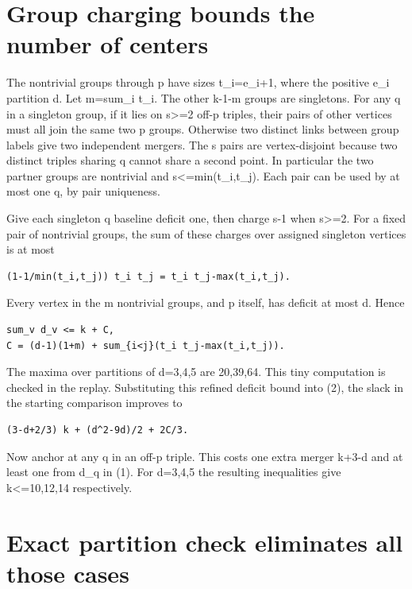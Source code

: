 \documentclass[11pt,letterpaper]{article}
\begin{document}
\section{Group charging bounds the number of
centers}\label{2-group-charging-bounds-the-number-of-centers}

The nontrivial groups through p have sizes t\_i=e\_i+1, where the
positive e\_i partition d. Let m=sum\_i t\_i. The other k-1-m groups are
singletons. For any q in a singleton group, if it lies on s>=2 off-p
triples, their pairs of other vertices must all join the same two p
groups. Otherwise two distinct links between group labels give two
independent mergers. The s pairs are vertex-disjoint because two
distinct triples sharing q cannot share a second point. In particular
the two partner groups are nontrivial and s<=min(t\_i,t\_j). Each pair
can be used by at most one q, by pair uniqueness.

Give each singleton q baseline deficit one, then charge s-1 when s>=2.
For a fixed pair of nontrivial groups, the sum of these charges over
assigned singleton vertices is at most

\begin{verbatim}
(1-1/min(t_i,t_j)) t_i t_j = t_i t_j-max(t_i,t_j).
\end{verbatim}

Every vertex in the m nontrivial groups, and p itself, has deficit at
most d. Hence

\begin{verbatim}
sum_v d_v <= k + C,
C = (d-1)(1+m) + sum_{i<j}(t_i t_j-max(t_i,t_j)).
\end{verbatim}

The maxima over partitions of d=3,4,5 are 20,39,64. This tiny
computation is checked in the replay. Substituting this refined deficit
bound into (2), the slack in the starting comparison improves to

\begin{verbatim}
(3-d+2/3) k + (d^2-9d)/2 + 2C/3.
\end{verbatim}

Now anchor at any q in an off-p triple. This costs one extra merger
k+3-d and at least one from d\_q in (1). For d=3,4,5 the resulting
inequalities give k<=10,12,14 respectively.

\section{Exact partition check eliminates all those
cases}\label{3-exact-partition-check-eliminates-all-those-cases}
\end{document}
